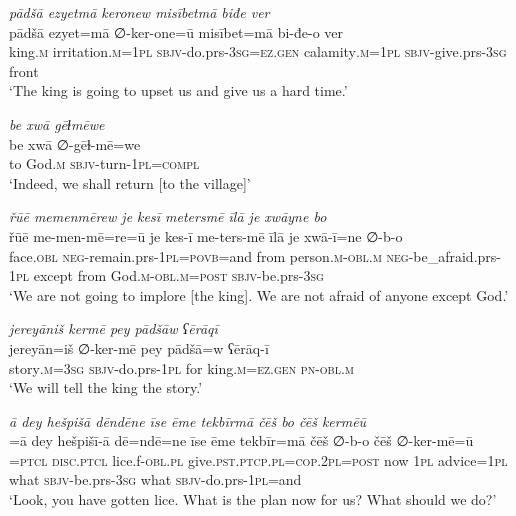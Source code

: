 \ea \label{BP.102}
\textit{pādšā ezyetmā keronew misībetmā biđe ver} \\ 
\gll pādšā ezyet=mā ∅-ker-one=ū misībet=mā bi-đe-o ver \\ 
 king\textsc{.m} irritation\textsc{.m}\textsc{=\textsc{1pl}} \textsc{sbjv-}do.prs\textsc{-3sg}\textsc{=ez.gen} calamity\textsc{.m}\textsc{=\textsc{1pl}} \textsc{sbjv-}give.prs\textsc{-3sg} front \\ 
\glt `The king is going to upset us and give us a hard time.'
\z 
 
\ea \label{BP.103}
\textit{be xwā gēɫmēwe} \\ 
\gll be xwā ∅-gēɫ-mē=we \\ 
 to God\textsc{.m} \textsc{sbjv-}turn\textsc{-\textsc{1pl}}\textsc{=compl} \\ 
\glt `Indeed, we shall return [to the village]'
\z 
 
\ea \label{BP.118}
\textit{řūē memenmērew je kesī metersmē īlā je xwāyne bo} \\ 
\gll řūē me-men-mē=re=ū je kes-ī me-ters-mē īlā je xwā-ī=ne ∅-b-o \\ 
 face\textsc{.obl} \textsc{neg-}remain.prs\textsc{-\textsc{1pl}}\textsc{=\textsc{povb}}=and from person\textsc{.m}\textsc{-obl}\textsc{.m} \textsc{neg-}be\_afraid.prs\textsc{-\textsc{1pl}} except from God\textsc{.m}\textsc{-obl}\textsc{.m}\textsc{=\textsc{post}} \textsc{sbjv-}be.prs\textsc{-3sg} \\ 
\glt `We are not going to implore [the king]. We are not afraid of anyone except God.'
\z 
 
\ea \label{BP.120}
\textit{jereyāniš kermē pey pādšāw ʕērāqī} \\ 
\gll jereyān=iš ∅-ker-mē pey pādšā=w ʕērāq-ī \\ 
 story\textsc{.m}\textsc{=3sg} \textsc{sbjv-}do.prs\textsc{-\textsc{1pl}} for king\textsc{.m}\textsc{=ez.gen} \textsc{pn}\textsc{-obl}\textsc{.m} \\ 
\glt `We will tell the king the story.'
\z 
 
\ea \label{BP.156}
\textit{ā dey hešpišā dēndēne īse ēme tekbīrmā čēš bo čēš kermēū} \\ 
\gll =ā dey hešpišī-ā dē=ndē=ne īse ēme tekbīr=mā čēš ∅-b-o čēš ∅-ker-mē=ū \\ 
=\textsc{ptcl} \textsc{disc.ptcl} lice.f\textsc{-obl}\textsc{.pl} give\textsc{.pst}\textsc{.ptcp}\textsc{.pl}\textsc{=cop}.\textsc{2pl}\textsc{=\textsc{post}} now \textsc{1pl} advice\textsc{=\textsc{1pl}} what \textsc{sbjv-}be.prs\textsc{-3sg} what \textsc{sbjv-}do.prs\textsc{-\textsc{1pl}}=and \\ 
\glt `Look, you have gotten lice. What is the plan now for us? What should we do?'
\z 
 
